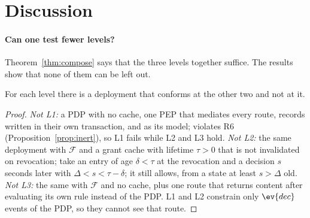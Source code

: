 
\section{Discussion}
\label{sec:discussion}



\paragraph{Can one test fewer levels?} Theorem~\ref{thm:compose} says that the three levels together suffice. The
results show that none of them can be left out.

\begin{proposition}[Independence]\label{prop:indep}
For each level there is a deployment that conforms at the other two and not at it.
\end{proposition}
\begin{proof}
\emph{Not L1:} a PDP with no cache, one PEP that mediates every route, records written in their own
transaction, and \chain as its model; \chain violates R6 (Proposition~\ref{prop:inert}), so L1 fails while L2
and L3 hold. \emph{Not L2:} the same deployment with $\mathcal{F}$ and a grant cache with lifetime $\tau>0$ that
is not invalidated on revocation; take an entry of age $\delta<\tau$ at the revocation and a decision $s$ seconds
later with $\Delta<s<\tau-\delta$; it still allows, from a state at least $s>\Delta$ old. \emph{Not L3:} the same with $\mathcal{F}$ and no cache, plus
one route that returns content after evaluating its own rule instead of the PDP. L1 and L2 constrain only
$\ev{dec}$ events of the PDP, so they cannot see that route.
\end{proof}

